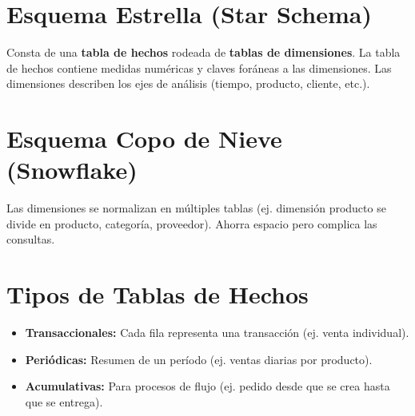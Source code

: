 \documentclass[12pt,a4paper,openany,oneside]{book}
\begin{document}
\section{Esquema Estrella (Star Schema)}
Consta de una \textbf{tabla de hechos} rodeada de \textbf{tablas de dimensiones}. La tabla de hechos contiene medidas numéricas y claves foráneas a las dimensiones. Las dimensiones describen los ejes de análisis (tiempo, producto, cliente, etc.).

\begin{center}
\end{center}

\section{Esquema Copo de Nieve (Snowflake)}
Las dimensiones se normalizan en múltiples tablas (ej. dimensión producto se divide en producto, categoría, proveedor). Ahorra espacio pero complica las consultas.

\section{Tipos de Tablas de Hechos}
\begin{itemize}
    \item \textbf{Transaccionales:} Cada fila representa una transacción (ej. venta individual).
    \item \textbf{Periódicas:} Resumen de un período (ej. ventas diarias por producto).
    \item \textbf{Acumulativas:} Para procesos de flujo (ej. pedido desde que se crea hasta que se entrega).
\end{itemize}
\end{document}
